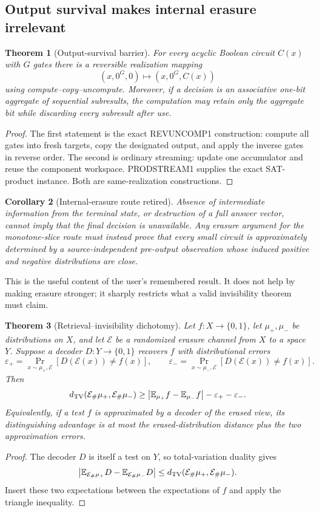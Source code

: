 \documentclass[11pt]{article}
\newtheorem{theorem}{Theorem}
\newtheorem{corollary}[theorem]{Corollary}
\begin{document}
\subsection{Output survival makes internal erasure irrelevant}
\begin{theorem}[Output-survival barrier]
For every acyclic Boolean circuit $C(x)$ with $G$ gates there is a reversible realization mapping
\[
(x,0^G,0)\longmapsto(x,0^G,C(x))
\]
using compute--copy--uncompute. Moreover, if a decision is an associative one-bit aggregate of sequential subresults, the computation may retain only the aggregate bit while discarding every subresult after use.
\end{theorem}
\begin{proof}
The first statement is the exact REVUNCOMP1 construction: compute all gates into fresh targets, copy the designated output, and apply the inverse gates in reverse order. The second is ordinary streaming: update one accumulator and reuse the component workspace. PRODSTREAM1 supplies the exact SAT-product instance. Both are same-realization constructions.
\end{proof}

\begin{corollary}[Internal-erasure route retired]
Absence of intermediate information from the terminal state, or destruction of a full answer vector, cannot imply that the final decision is unavailable. Any erasure argument for the monotone-slice route must instead prove that every small circuit is approximately determined by a \emph{source-independent pre-output observation} whose induced positive and negative distributions are close.
\end{corollary}

This is the useful content of the user's remembered result. It does not help by making erasure stronger; it sharply restricts what a valid invisibility theorem must claim.

\begin{theorem}[Retrieval--invisibility dichotomy]
Let $f:X\to\{0,1\}$, let $\mu_+,\mu_-$ be distributions on $X$, and let $\mathcal E$ be a randomized erasure channel from $X$ to a space $Y$. Suppose a decoder $D:Y\to\{0,1\}$ recovers $f$ with distributional errors
\[
\varepsilon_+=\Pr_{x\sim\mu_+,\mathcal E}[D(\mathcal E(x))\ne f(x)],\qquad
\varepsilon_-=\Pr_{x\sim\mu_-,\mathcal E}[D(\mathcal E(x))\ne f(x)].
\]
Then
\[
 d_{\rm TV}(\mathcal E_\#\mu_+,\mathcal E_\#\mu_-)
 \ge
 \left|\mathbb E_{\mu_+}f-\mathbb E_{\mu_-}f\right|-\varepsilon_+-\varepsilon_-.
\]
Equivalently, if a test $f$ is approximated by a decoder of the erased view, its distinguishing advantage is at most the erased-distribution distance plus the two approximation errors.
\end{theorem}
\begin{proof}
The decoder $D$ is itself a test on $Y$, so total-variation duality gives
\[
\left|\mathbb E_{\mathcal E_\#\mu_+}D-\mathbb E_{\mathcal E_\#\mu_-}D\right|
\le d_{\rm TV}(\mathcal E_\#\mu_+,\mathcal E_\#\mu_-).
\]
Insert these two expectations between the expectations of $f$ and apply the triangle inequality.
\end{proof}
\end{document}

